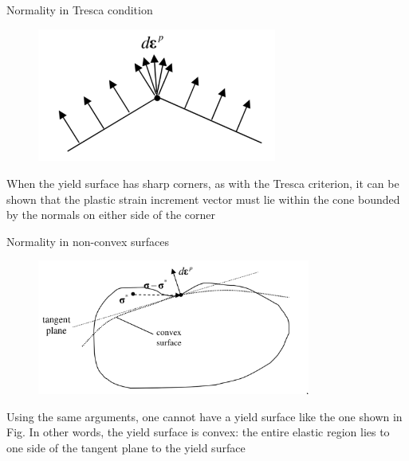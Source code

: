 \documentclass[notes]{beamer}
\begin{document}
\begin{frame}{Normality in Tresca condition}
	\begin{figure}
		\includegraphics[width=0.7\textwidth]{figs/tresca-corner.png}
	\end{figure}
When the yield surface has sharp corners, as with the Tresca criterion, it can be shown that the plastic strain increment vector must lie within the cone bounded by the normals on either side of the corner
\end{frame}


\begin{frame}{Normality in non-convex surfaces}
	\begin{figure}
		\includegraphics[width=0.8\textwidth]{figs/non-convex-yield.png}
	\end{figure}
Using the same arguments, one cannot have a yield surface like the one shown in Fig.  In other words, the yield surface is convex: the entire elastic region lies to one side of the tangent plane to the yield surface
\end{frame}
\end{document}
